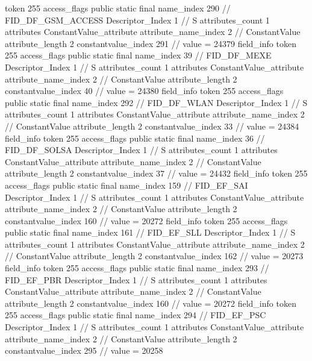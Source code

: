 {{{{{				token	255
				access_flags	public static final
				name_index	290		// FID_DF_GSM_ACCESS
				Descriptor_Index	1		// S
				attributes_count	1
				attributes {
				ConstantValue_attribute {
					attribute_name_index	2		// ConstantValue
					attribute_length	2
					constantvalue_index	291		// value = 24379
				}
				}
			}
			field_info {
				token	255
				access_flags	public static final
				name_index	39		// FID_DF_MEXE
				Descriptor_Index	1		// S
				attributes_count	1
				attributes {
				ConstantValue_attribute {
					attribute_name_index	2		// ConstantValue
					attribute_length	2
					constantvalue_index	40		// value = 24380
				}
				}
			}
			field_info {
				token	255
				access_flags	public static final
				name_index	292		// FID_DF_WLAN
				Descriptor_Index	1		// S
				attributes_count	1
				attributes {
				ConstantValue_attribute {
					attribute_name_index	2		// ConstantValue
					attribute_length	2
					constantvalue_index	33		// value = 24384
				}
				}
			}
			field_info {
				token	255
				access_flags	public static final
				name_index	36		// FID_DF_SOLSA
				Descriptor_Index	1		// S
				attributes_count	1
				attributes {
				ConstantValue_attribute {
					attribute_name_index	2		// ConstantValue
					attribute_length	2
					constantvalue_index	37		// value = 24432
				}
				}
			}
			field_info {
				token	255
				access_flags	public static final
				name_index	159		// FID_EF_SAI
				Descriptor_Index	1		// S
				attributes_count	1
				attributes {
				ConstantValue_attribute {
					attribute_name_index	2		// ConstantValue
					attribute_length	2
					constantvalue_index	160		// value = 20272
				}
				}
			}
			field_info {
				token	255
				access_flags	public static final
				name_index	161		// FID_EF_SLL
				Descriptor_Index	1		// S
				attributes_count	1
				attributes {
				ConstantValue_attribute {
					attribute_name_index	2		// ConstantValue
					attribute_length	2
					constantvalue_index	162		// value = 20273
				}
				}
			}
			field_info {
				token	255
				access_flags	public static final
				name_index	293		// FID_EF_PBR
				Descriptor_Index	1		// S
				attributes_count	1
				attributes {
				ConstantValue_attribute {
					attribute_name_index	2		// ConstantValue
					attribute_length	2
					constantvalue_index	160		// value = 20272
				}
				}
			}
			field_info {
				token	255
				access_flags	public static final
				name_index	294		// FID_EF_PSC
				Descriptor_Index	1		// S
				attributes_count	1
				attributes {
				ConstantValue_attribute {
					attribute_name_index	2		// ConstantValue
					attribute_length	2
					constantvalue_index	295		// value = 20258
}}}}}}}
